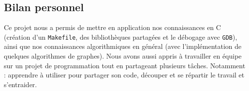 \documentclass[11pt]{article}
\begin{document}
\subsection{Bilan personnel}
Ce projet nous a permis de mettre en application nos connaissances en C (création d'un \texttt{Makefile}, des bibliothèques partagées et le débogage avec \texttt{GDB}), ainsi que nos connaissances algorithmiques en général (avec l’implémentation de quelques algorithmes de graphes).
Nous avons aussi appris à travailler en équipe sur un projet de programmation tout en partageant plusieurs tâches. Notamment : apprendre à utiliser  pour partager son code, découper et se répartir le travail et s’entraider.
\end{document}
